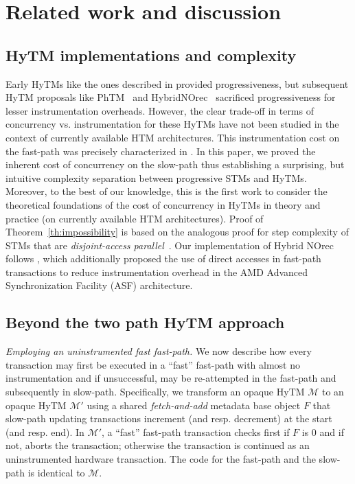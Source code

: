 \section{Related work and discussion}
\label{sec:rel}
%
\subsection{HyTM implementations and complexity}
Early HyTMs like the ones described in \cite{damronhytm, kumarhytm} provided progressiveness, but
subsequent HyTM proposals like PhTM~\cite{phasedtm} and HybridNOrec~\cite{hybridnorec} sacrificed progressiveness for lesser instrumentation overheads.
However, the clear trade-off in terms of concurrency vs. instrumentation for these HyTMs have not been studied in the context of currently available HTM
architectures. This instrumentation cost on the fast-path was precisely characterized in \cite{hytm14disc}.
In this paper, we proved the inherent cost of concurrency on the slow-path thus establishing a surprising, 
but intuitive complexity separation between progressive STMs and HyTMs.
Moreover, to the best of our knowledge, this is the first work to consider the theoretical foundations of the cost of concurrency in 
HyTMs in theory and practice (on currently available HTM architectures).
Proof of Theorem~\ref{th:impossibility} is based on the analogous proof for step complexity of STMs that are \emph{disjoint-access parallel}~\cite{prog15-pact, tm-book}.
Our implementation of Hybrid NOrec follows \cite{hynorecriegel}, which additionally proposed the use of direct accesses
in fast-path transactions to reduce instrumentation overhead in the AMD Advanced Synchronization Facility (ASF) architecture.

\subsection{Beyond the two path HyTM approach}
\vspace{1mm}\noindent\textit{Employing an uninstrumented fast fast-path.}
We now describe how every transaction may first be executed in a ``fast'' fast-path with almost no instrumentation
and if unsuccessful, may be re-attempted in the fast-path and subsequently in slow-path.
Specifically, we transform an opaque HyTM $\mathcal{M}$ to an opaque
HyTM $\mathcal{M}'$ using a shared \emph{fetch-and-add} metadata base object $F$ that slow-path updating transactions
increment (and resp. decrement) at the start (and resp. end). In $\mathcal{M}'$, a ``fast'' fast-path transaction checks first if $F$ is $0$
and if not, aborts the transaction; otherwise the transaction is continued as an uninstrumented hardware transaction.
The code for the fast-path and the slow-path is identical to $\mathcal{M}$.


